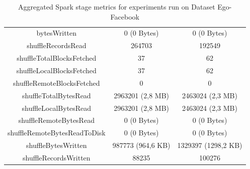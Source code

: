 \documentclass[a4paper,11pt, twoside]{article}
\begin{document}
\begin{table}[h!]
\begin{tabular}{ccc}
                        bytesWritten & 0 (0 Bytes) & 0 (0 Bytes) \\
                        shuffleRecordsRead & 264703 & 192549 \\
                        shuffleTotalBlocksFetched & 37 & 62 \\
                        shuffleLocalBlocksFetched & 37 & 62 \\
                        shuffleRemoteBlocksFetched & 0 & 0 \\
                        shuffleTotalBytesRead & 2963201 (2,8 MB) & 2463024 (2,3 MB) \\
                        shuffleLocalBytesRead & 2963201 (2,8 MB) & 2463024 (2,3 MB) \\
                        shuffleRemoteBytesRead & 0 (0 Bytes) & 0 (0 Bytes) \\
                        shuffleRemoteBytesReadToDisk & 0 (0 Bytes) & 0 (0 Bytes) \\
                        shuffleBytesWritten & 987773 (964,6 KB) & 1329397 (1298,2 KB) \\
                        shuffleRecordsWritten & 88235 & 100276 \\
            		\bottomrule
            	\end{tabular}
                    \caption{Aggregated Spark stage metrics for experiments run on Dataset Ego-Facebook}
                    \label{tab:stagemetrics2}
            \end{table} 
\end{document}
